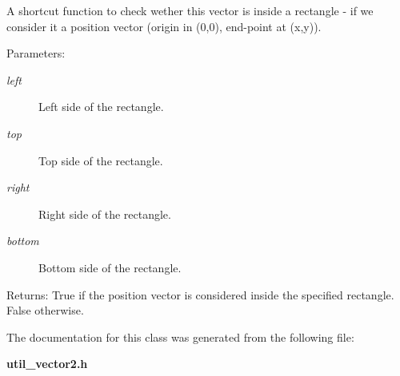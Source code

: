 A shortcut function to check wether this vector is inside a rectangle - if we consider it a position vector (origin in (0,0), end-point at (x,y)). \begin{Desc}
\item[Parameters:]
\begin{description}
\item[{\em left}]Left side of the rectangle. \item[{\em top}]Top side of the rectangle. \item[{\em right}]Right side of the rectangle. \item[{\em bottom}]Bottom side of the rectangle. \end{description}
\end{Desc}
\begin{Desc}
\item[Returns:]True if the position vector is considered inside the specified rectangle. False otherwise. \end{Desc}


The documentation for this class was generated from the following file:\begin{CompactItemize}
\item 
{\bf util\_\-vector2.h}\end{CompactItemize}
